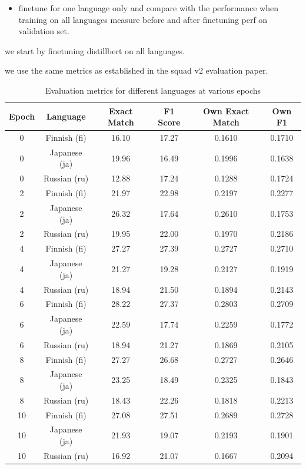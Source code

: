 \documentclass[11pt]{article}
\begin{document}
\begin{itemize}
    \item 
    finetune for one language only and compare with the performance when training on all languages
    measure before and after finetuning perf on validation set.
\end{itemize}

we start by finetuning distillbert on all languages.


we use the same metrics as established in the squad v2 evaluation paper. \cite{rajpurkar-etal-2018-know}

\begin{table}[ht]
    \centering
    \begin{tabular}{|c|c|c|c|c|c|}
        \hline
        Epoch & Language & Exact Match & F1 Score & Own Exact Match & Own F1 \\
        \hline
        0 & Finnish (fi) & 16.10 & 17.27 & 0.1610 & 0.1710 \\
        0 & Japanese (ja) & 19.96 & 16.49 & 0.1996 & 0.1638 \\
        0 & Russian (ru) & 12.88 & 17.24 & 0.1288 & 0.1724 \\
        \hline
        2 & Finnish (fi) & 21.97 & 22.98 & 0.2197 & 0.2277 \\
        2 & Japanese (ja) & 26.32 & 17.64 & 0.2610 & 0.1753 \\
        2 & Russian (ru) & 19.95 & 22.00 & 0.1970 & 0.2186 \\
        \hline
        4 & Finnish (fi) & 27.27 & 27.39 & 0.2727 & 0.2710 \\
        4 & Japanese (ja) & 21.27 & 19.28 & 0.2127 & 0.1919 \\
        4 & Russian (ru) & 18.94 & 21.50 & 0.1894 & 0.2143 \\
        \hline
        6 & Finnish (fi) & 28.22 & 27.37 & 0.2803 & 0.2709 \\
        6 & Japanese (ja) & 22.59 & 17.74 & 0.2259 & 0.1772 \\
        6 & Russian (ru) & 18.94 & 21.27 & 0.1869 & 0.2105 \\
        \hline
        8 & Finnish (fi) & 27.27 & 26.68 & 0.2727 & 0.2646 \\
        8 & Japanese (ja) & 23.25 & 18.49 & 0.2325 & 0.1843 \\
        8 & Russian (ru) & 18.43 & 22.26 & 0.1818 & 0.2213 \\
        \hline
        10 & Finnish (fi) & 27.08 & 27.51 & 0.2689 & 0.2728 \\
        10 & Japanese (ja) & 21.93 & 19.07 & 0.2193 & 0.1901 \\
        10 & Russian (ru) & 16.92 & 21.07 & 0.1667 & 0.2094 \\
        \hline
    \end{tabular}
    \caption{Evaluation metrics for different languages at various epochs}
    \label{tab:evaluation_metrics}
\end{table}
\end{document}
